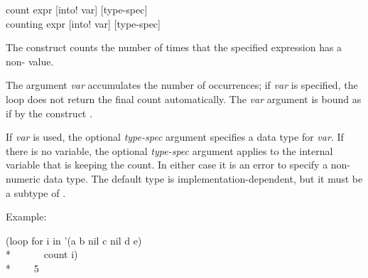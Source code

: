 \begin{defloop}
count expr [\!into! var] [type-spec] \\
counting expr [\!into! var] [type-spec]

The  construct counts the number of times that the specified 
expression has a non- value.

The argument {\it var\/} accumulates the number of occurrences; if 
{\it var} is specified, the loop
does not return the final count automatically.  The {\it var\/} argument
is bound as if by the construct .

If  {\it var\/} is used, the optional
{\it type-spec\/} argument specifies a data type for {\it var\/}.
If there is no  variable, the optional {\it type-spec\/}
argument applies to the internal variable that is keeping the count.
In either case it is an error to specify a non-numeric 
data type.
The default type is implementation-dependent, but it must be a subtype
of .

Example:
\begin{lisp}
(loop for i in '(a b nil c nil d e) \\*
~~~~~~count i) \\*
~~~\EV~5
\end{lisp}
\end{defloop}


